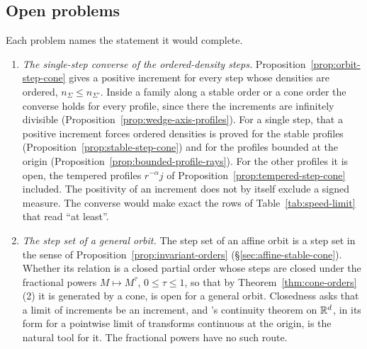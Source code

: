 \subsection{Open problems}\label{sec:open-problems}

Each problem names the statement it would complete.
\begin{enumerate}
\item \emph{The single-step converse of the ordered-density steps.}\label{prob:ordered-density-converse} Proposition~\ref{prop:orbit-step-cone} gives
a positive increment for every step whose \Levy{} densities are ordered, $n_\Sigma \le n_{\Sigma'}$.
Inside a family along a stable order or a cone order the converse holds for every profile,
since there the increments are infinitely divisible (Proposition~\ref{prop:wedge-axis-profiles}). For a single step, that a
positive increment forces ordered densities is proved for the stable profiles
(Proposition~\ref{prop:stable-step-cone}) and for the profiles bounded at the origin
(Proposition~\ref{prop:bounded-profile-rays}). For the other profiles it is open, the tempered
profiles $r^{-\alpha}j$ of Proposition~\ref{prop:tempered-step-cone} included. The positivity of an
increment does not by itself exclude a signed \Levy{} measure. The converse would make exact the rows
of Table~\ref{tab:speed-limit} that read ``at least''.

\item \emph{The step set of a general orbit.} The step set of an affine orbit is a step set in the
sense of Proposition~\ref{prop:invariant-orders} (\S\ref{sec:affine-stable-cone}). Whether its relation
is a closed partial order whose steps
are closed under the fractional powers $M \mapsto M^\tau$, $0 \le \tau \le 1$, so that by
Theorem~\ref{thm:cone-orders}(2) it is generated by a cone, is open for a general orbit.
Closedness asks that a limit of increments be an increment, and \Levy's continuity theorem on
$\mathbb{R}^d$, in its form for a pointwise limit of transforms continuous at the origin, is the natural
tool for it. The fractional powers have no such route.


\end{enumerate}
